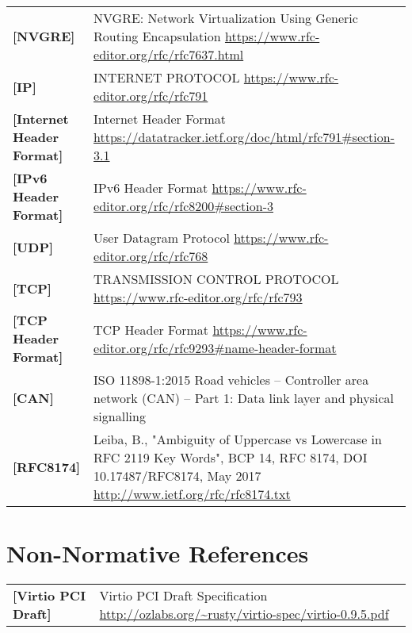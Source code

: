 \begin{longtable}{l p{5in}}
	\label{intro:nvgre}\textbf{[NVGRE]} &
    NVGRE: Network Virtualization Using Generic Routing Encapsulation
	\newline\url{https://www.rfc-editor.org/rfc/rfc7637.html}\\
	\label{intro:IP}\textbf{[IP]} &
    INTERNET PROTOCOL
	\newline\url{https://www.rfc-editor.org/rfc/rfc791}\\
	\label{intro:Internet-Header-Format}\textbf{[Internet Header Format]} &
    Internet Header Format
	\newline\url{https://datatracker.ietf.org/doc/html/rfc791#section-3.1}\\
	\label{intro:IPv6-Header-Format}\textbf{[IPv6 Header Format]} &
    IPv6 Header Format
	\newline\url{https://www.rfc-editor.org/rfc/rfc8200#section-3}\\
	\label{intro:UDP}\textbf{[UDP]} &
    User Datagram Protocol
	\newline\url{https://www.rfc-editor.org/rfc/rfc768}\\
	\label{intro:TCP}\textbf{[TCP]} &
    TRANSMISSION CONTROL PROTOCOL
	\newline\url{https://www.rfc-editor.org/rfc/rfc793}\\
	\label{intro:TCP-Header-Format}\textbf{[TCP Header Format]} &
    TCP Header Format
	\newline\url{https://www.rfc-editor.org/rfc/rfc9293#name-header-format}\\
	\label{intro:CAN}\textbf{[CAN]} &
    ISO 11898-1:2015 Road vehicles -- Controller area network (CAN) -- Part 1: Data link layer and physical signalling\\
	\label{intro:rfc8174}\textbf{[RFC8174]} &
    Leiba, B., "Ambiguity of Uppercase vs Lowercase in RFC 2119 Key Words", BCP
    14, RFC 8174, DOI 10.17487/RFC8174, May 2017
        \newline\url{http://www.ietf.org/rfc/rfc8174.txt}\\
\end{longtable}

\section{Non-Normative References}

\begin{longtable}{l p{5in}}
	\label{intro:Virtio PCI Draft}\textbf{[Virtio PCI Draft]} &
	Virtio PCI Draft Specification
	\newline\url{http://ozlabs.org/~rusty/virtio-spec/virtio-0.9.5.pdf}\\
\end{longtable}


